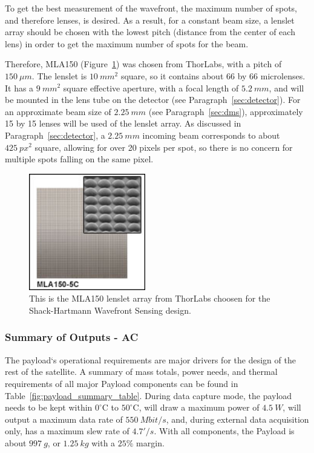 \documentclass[12pt]{article}
\begin{document}
To get the best measurement of the wavefront, the maximum number of spots, and therefore lenses, is desired. As a result, for a constant beam size, a lenslet array should be chosen with the lowest pitch (distance from the center of each lens) in order to get the maximum number of spots for the beam.


Therefore, MLA150 (Figure~\ref{fig:MLA150}) was chosen from ThorLabs, with a pitch of $150\ \mu m$.
The lenslet is $10\ mm^2$ square, so it contains about 66 by 66 microlenses. It has a $9\ mm^2$ square effective aperture, with a focal length of $5.2\ mm$, and will be mounted in the lens tube on the detector (see Paragraph~\ref{sec:detector}). For an approximate beam size of $2.25\ mm$ (see Paragraph~\ref{sec:dms}), approximately 15 by 15 lenses will be used of the lenslet array. As discussed in Paragraph~\ref{sec:detector}, a $2.25\ mm$ incoming beam corresponds to about $425\ px^2$ square, allowing for over 20 pixels per spot, so there is no concern for multiple spots falling on the same pixel. 

\begin{figure}[ht]
\centering
  \includegraphics[width=2in]{images/payload_MLA150.jpg}
\caption{This is the MLA150 lenslet array from ThorLabs choosen for the Shack-Hartmann Wavefront Sensing design.}
\label{fig:MLA150}
\end{figure}



			\subsubsection{Summary of Outputs - AC}

The payload`s operational requirements are major drivers for the design of the rest of the satellite. A summary of mass totals, power needs, and thermal requirements of all major Payload components can be found in Table~\ref{fig:payload_summary_table}.  
During data capture mode, the payload needs to be kept within $0^\circ$C to $50^\circ$C, will draw a maximum power of $4.5\ W$, will output a maximum data rate of $550\ Mbit/s$, and, during external data acquisition only, has a maximum slew rate of $4.7'/s$. 
With all components, the Payload is about $997\ g$, or $1.25\ kg$ with a $25\%$ margin.  
\end{document}
